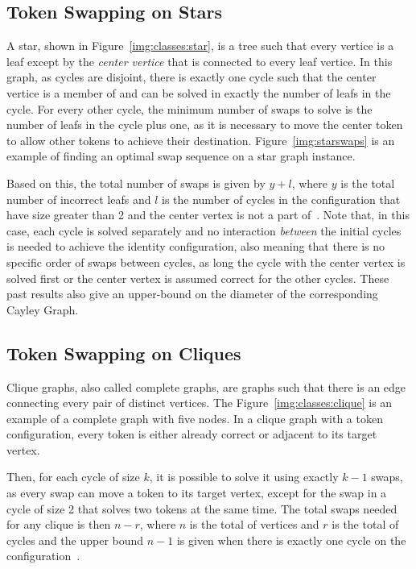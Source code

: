 \documentclass[msc,english,table,xcdraw]{ppgccufmg}
\begin{document}
\subsection{Token Swapping on Stars}
\label{sec:intro:classes_uppers:star}

A star, shown in Figure~\ref{img:classes:star}, is a tree such that every vertice
is a leaf except by the \textit{center vertice} that is connected to every leaf 
vertice.
In this graph, as cycles are disjoint, there is exactly one cycle such that
the center vertice is a member of and can be solved in exactly the number of leafs
in the cycle.
For every other cycle, the minimum number of swaps to solve is the number of
leafs in the cycle plus one, as it is necessary to move the center token to
allow other tokens to achieve their destination.
Figure~\ref{img:starswaps} is an example of finding an optimal swap sequence on 
a star graph instance.


Based on this, the total number of swaps is given by $y + l$, where $y$ is the
total number of incorrect leafs and $l$ is the number of cycles in the configuration
that have size greater than 2 and the center vertex is not a part of~\citep
{Akers:1989,Ahmad:2019}.
Note that, in this case, each cycle is solved separately and no interaction
\textit{between} the initial cycles is needed to achieve the identity configuration,
also meaning that there is no specific order of swaps between cycles, as long
the cycle with the center vertex is solved first or the center vertex is
assumed correct for the other cycles.
These past results also give an upper-bound on the diameter of the corresponding 
Cayley Graph.

\subsection{Token Swapping on Cliques}
\label{sec:intro:classes_uppers:clique}

Clique graphs, also called complete graphs, are graphs such that there is an 
edge connecting every pair of distinct vertices.
The Figure~\ref{img:classes:clique} is an example of a complete graph with
five nodes.
In a clique graph with a token configuration, every token is either already 
correct or adjacent to its target vertex.

Then, for each cycle of size $k$, it is possible to solve it using exactly
$k-1$ swaps, as every swap can move a token to its target vertex, except for
the swap in a cycle of size 2 that solves two tokens at the same time.
The total swaps needed for any clique is then $n - r$, where $n$ is the total of
vertices and $r$ is the total of cycles and the upper bound $n - 1$ is given when
there is exactly one cycle on the configuration~\citep{Kim:2016}.
\end{document}
